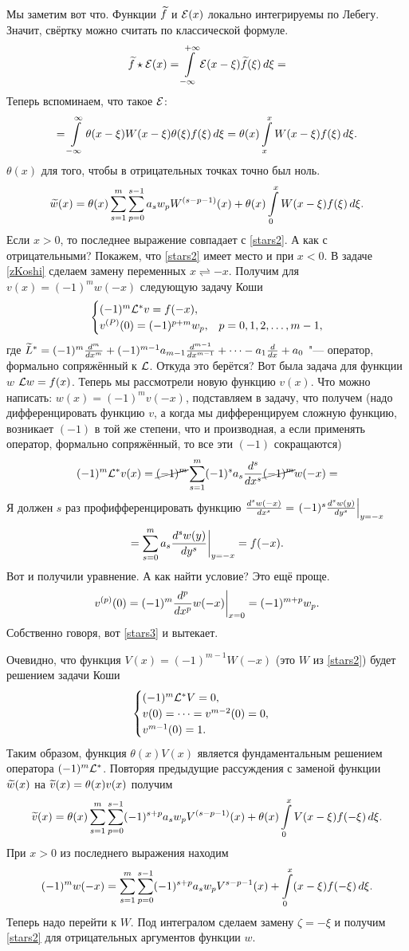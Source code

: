 \begin{Proof}
Мы заметим вот что. Функции $\widetilde{f}{}$ и $\mathcal E(x)$ локально интегрируемы по Лебегу. Значит, свёртку можно считать по классической формуле.
\[
  \widetilde{f}{}\star \mathcal E(x) = \int\limits_{-\infty}^{+\infty}\mathcal E(x-\xi)\widetilde{f}{}(\xi)\,d\xi = 
\]
Теперь вспоминаем, что такое $\mathcal E$:
\[
  = \int\limits_{-\infty}^{\infty}\theta(x-\xi) W(x-\xi)\theta(\xi) f(\xi)\,d\xi = \theta(x)\int\limits_x^x W(x-\xi)f(\xi)\,d\xi.
\]
$\theta(x)$ для того, чтобы в отрицательных точках точно был ноль.
\[
  \widetilde{w}{}(x) = \theta(x)\sum\limits_{s = 1}^{m}\sum\limits_{p = 0}^{s-1} a_sw_p W^{(s-p-1)}(x) + \theta(x)\int\limits_0^x W(x-\xi)f(\xi)\,d\xi.
\]
Если $x>0$, то последнее выражение совпадает с \eqref{stars2}. А как с отрицательными? Покажем, что \eqref{stars2} имеет место и при $x<0$. В задаче \eqref{zKoshi} сделаем замену переменных $x\rightleftharpoons -x$. Получим для $v(x) = (-1)^m w(-x)$ следующую задачу Коши
\begin{equation}\label{stars3}
  \begin{cases}
    (-1)^m\mathcal L^* v = f(-x),\\
    v^{(P)}(0) = (-1)^{p+m}w_p,&p=0,1,2,\dots,m-1,
  \end{cases}
\end{equation}
где $\widetilde{L}{}^* = (-1)^m\frac{d^m}{dx^m} + (-1)^{m-1}a_{m-1}\frac{d^{m-1}}{dx^{m-1}}+\dots-a_1\frac{d}{dx}+a_0$ "--- оператор, формально сопряжённый к $\mathcal L$. Откуда это берётся? Вот была задача для функции $w$ $\mathcal L w = f(x)$. Теперь мы рассмотрели новую функцию $v(x)$. Что можно написать: $w(x) = (-1)^m v(-x)$, подставляем в задачу, что получем (надо дифференцировать функцию $v$, а когда мы дифференцируем сложную функцию, возникает $(-1)$ в той же степени, что и производная, а если применять оператор, формально сопряжённый, то все эти $(-1)$ сокращаются)
\[
  (-1)^m\mathcal L^* v(x) = \cancel{(-1)^m} \sum\limits_{s = 1}^{m}(-1)^s a_s\frac{d^{s}}{dx^s}\cancel{(-1)^m}w(-x)=
\]
Я должен $s$ раз профифференцировать функцию $\frac{d^s w(-x)}{dx^s} = \left.(-1)^s \frac{d^sw(y)}{dy^s}\right|_{y=-x}$
\[
  = \sum\limits_{s = 0}^{m} a_s\frac{d^sw(y)}{dy^s}\bigg|_{y=-x} = f(-x).
\]
Вот и получили уравнение. А как найти условие? Это ещё проще.
\[
  v^{(p)}(0) = (-1)^m\frac{d^p}{dx^p} w(-x)\bigg|_{x=0} = (-1)^{m+p} w_p.
\]
Собственно говоря, вот \eqref{stars3} и вытекает.

Очевидно, что функция $V(x) = (-1)^{m-1} W(-x)$ (это $W$ из \eqref{stars2}) будет решением задачи Коши 
\[
  \begin{cases}
    (-1)^m\mathcal L^* V = 0,\\
    v(0)=\dots=v^{m-2}(0) = 0,\\
    v^{m-1}(0)=1.
  \end{cases}
\]
Таким образом, функция $\theta(x) V(x)$ является фундаментальным решением оператора $(-1)^m\mathcal L^*$. Повторяя предыдущие рассуждения с заменой функции $\widetilde{w}{}(x)$ на $\widetilde{v}{}(x) = \theta(x) v(x)$ получим 
\[
  \widetilde{v}{}(x) =  \theta(x)\sum\limits_{s = 1}^{m}\sum\limits_{p = 0}^{s-1}(-1)^{s+p}a_s w_p V^{(s-p-1)}(x) + \theta(x)\int\limits_0^x V(x-\xi)f(-\xi)\,d\xi.
\]
При $x>0$ из последнего выражения находим 
\[
  (-1)^mw(-x) = \sum\limits_{s = 1}^{m}\sum\limits_{p = 0}^{s-1}(-1)^{s+p}a_s w_p V^{s-p-1}(x) + \int\limits_0^x(x-\xi) f(-\xi)\,d\xi.
\]
Теперь надо перейти к $W$. Под интегралом сделаем замену $\zeta = -\xi$ и получим \eqref{stars2} для отрицательных аргументов функции $w$.
\end{Proof}

